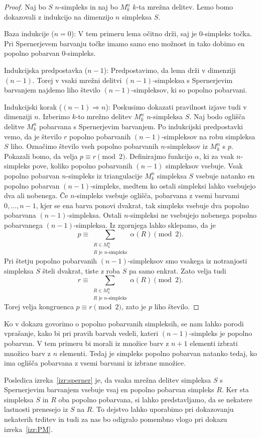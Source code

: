\documentclass[mat1]{fmfdelo}
\newcommand{\0}{0}
\begin{document}
\begin{proof}
Naj bo $S$ $n$-simpleks in naj bo $M_k^n$ $k$-ta mrežna delitev. Lemo bomo dokazovali z indukcijo na dimenzijo $n$ simpleksa $S$.

Baza indukcije ($n = 0$):
V tem primeru lema očitno drži, saj je $0$-simpleks točka. Pri Spernerjevem barvanju točke imamo samo eno možnost in tako dobimo en popolno pobarvan $0$-simpleks.

Indukcijska predpostavka ($n - 1$):
Predpostavimo, da lema drži v dimenziji $(n - 1)$. Torej v vsaki mrežni delitvi $(n - 1)$-simpleksa s Spernerjevim barvanjem najdemo liho število $(n - 1)$-simpleksov, ki so popolno pobarvani.

Indukcijski korak ($(n - 1) \Longrightarrow n$):
Poskusimo dokazati pravilnost izjave tudi v dimenziji $n$. Izberimo $k$-to mrežno delitev $M_k^n$ $n$-simpleksa $S$. Naj bodo oglišča delitve $M_k^n$ pobarvana s Spernerjevim barvanjem. Po indukcijski predpostavki vemo, da je število $r$ popolno pobarvanih $(n-1)$-simpleksov na robu simpleksa $S$ liho. Označimo število vseh popolno pobarvanih $n$-simpleksov iz $M_k^n$ s $p$. Pokazali bomo, da velja $p \equiv r \pmod 2$.
Definirajmo funkcijo $\alpha$, ki za vsak $n$-simpleks pove, koliko popolno pobarvanih $(n-1)$ simpleksov vsebuje. Vsak popolno pobarvan $n$-simpleks iz triangulacije $M_k^n$ simpleksa $S$ vsebuje natanko en popolno pobarvan $(n-1)$-simpleks, medtem ko ostali simpleksi lahko vsebujejo dva ali nobenega. Če $n$-simpleks vsebuje oglišča, pobarvana z vsemi barvami $0, \dots, n-1$, kjer se ena barva ponovi dvakrat, tak simpleks vsebuje dva popolno pobarvana $(n-1)$-simpleksa. Ostali $n$-simpleksi ne vsebujejo nobenega popolno pobarvanega $(n - 1)$-simpleksa. Iz zgornjega lahko sklepamo, da je 
$$p \equiv 
\sum\limits_{\substack{
R \in M_k^n
 \\ 
R\text{ je } n\text{-simpleks}
 }} 
 \alpha(R) \pmod 2.$$
Pri štetju popolno pobarvanih $(n - 1)$-simpleksov smo vsakega iz notranjosti simpleksa $S$ šteli dvakrat, tiste z roba $S$ pa samo enkrat. Zato velja tudi 
$$r \equiv 
\sum\limits_{\substack{
R \in M_k^n
 \\ 
R\text{ je } n\text{-simpleks}
 }}
  \alpha(R) \pmod 2.$$ 
Torej velja kongruenca $p \equiv r \pmod 2$, zato je $p$ liho število.
\end{proof}
\begin{opomba}
Ko v dokazu govorimo o popolno pobarvanih simpleksih, se nam lahko porodi vprašanje, kako bi pri pravih barvah vedeli, kateri $(n-1)$-simpleks je popolno pobarvan. V tem primeru bi morali iz množice barv z $n+1$ elementi izbrati množico barv z $n$ elementi. Tedaj je simpleks popolno pobarvan natanko tedaj, ko ima oglišča pobarvana z vsemi barvami iz izbrane množice.
\end{opomba}
Posledica izreka~\ref{izr:sperner} je, da vsaka mrežna delitev simpleksa $S$ s Spernerjevim barvanjem vsebuje vsaj en popolno pobarvan simpleks $R$. Ker sta simpleksa $S$ in $R$ oba popolno pobarvana, si lahko predstavljamo, da se nekatere lastnosti prenesejo iz $S$ na $R$. To dejstvo lahko uporabimo pri dokazovanju nekaterih trditev in tudi za nas bo odigralo pomembno vlogo pri dokazu izreka~\ref{izr:PM}. 
\end{document}
